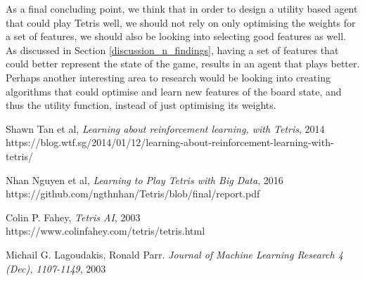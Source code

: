 \documentclass[a4paper,12pt,twocolumn]{article}
\begin{document}
As a final concluding point, we think that in order to design a utility based agent
that could play Tetris well, we should not rely on only optimising the weights
for a set of features, we should also be looking into selecting good features as well.
As discussed in Section \ref{discussion_n_findings}, having a set of features that
could better represent the state of the game, results in an agent that plays better.
Perhaps another interesting area to research would be looking into creating algorithms
that could optimise and learn new features of the board state, and thus the utility
function, instead of just optimising its weights.\\

\begin{thebibliography}{9}
    Shawn Tan et al, \textit{Learning about reinforcement learning, with Tetris}, 2014\\https://blog.wtf.sg/2014/01/12/learning-about-reinforcement-learning-with-tetris/

    Nhan Nguyen et al, \textit{Learning to Play Tetris with Big Data}, 2016\\https://github.com/ngthnhan/Tetris/blob/final/report.pdf

    Colin P. Fahey, \textit{Tetris AI}, 2003\\https://www.colinfahey.com/tetris/tetris.html
    
    Michail G. Lagoudakis, Ronald Parr.
    \textit{Journal of Machine Learning Research 4 (Dec), 1107-1149}, 2003
\end{thebibliography}
\end{document}
